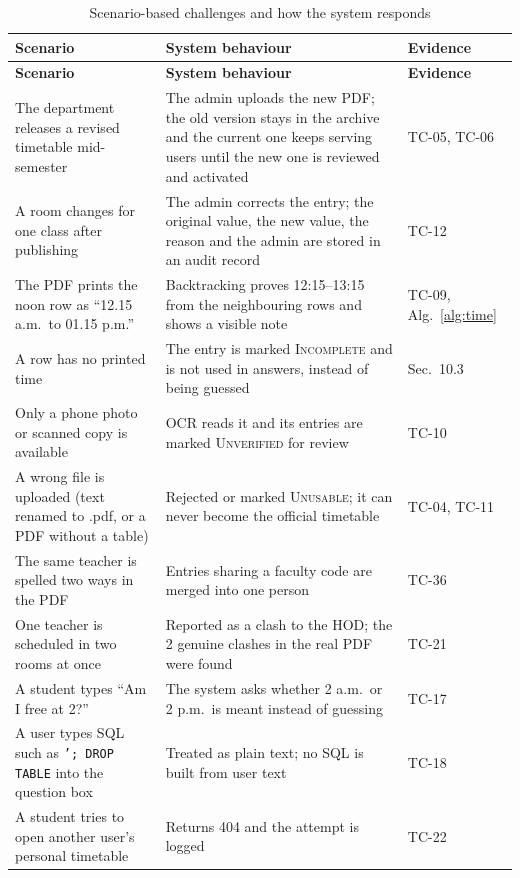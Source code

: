 \begingroup
\small
\begin{longtable}{@{}>{\raggedright\arraybackslash}p{4.2cm}>{\raggedright\arraybackslash}p{7.3cm}>{\raggedright\arraybackslash}p{2.6cm}@{}}
\caption{Scenario-based challenges and how the system responds}\label{tab:scenarios}\\
\toprule
\textbf{Scenario} & \textbf{System behaviour} & \textbf{Evidence}\\
\midrule
\endfirsthead
\toprule
\textbf{Scenario} & \textbf{System behaviour} & \textbf{Evidence}\\
\midrule
\endhead
The department releases a revised timetable mid-semester & The admin uploads the new PDF; the old version stays in the archive and the current one keeps serving users until the new one is reviewed and activated & TC-05, TC-06\\
A room changes for one class after publishing & The admin corrects the entry; the original value, the new value, the reason and the admin are stored in an audit record & TC-12\\
The PDF prints the noon row as ``12.15 a.m.\ to 01.15 p.m.'' & Backtracking proves 12:15--13:15 from the neighbouring rows and shows a visible note & TC-09, Alg.~\ref{alg:time}\\
A row has no printed time & The entry is marked \textsc{Incomplete} and is not used in answers, instead of being guessed & Sec.~10.3\\
Only a phone photo or scanned copy is available & OCR reads it and its entries are marked \textsc{Unverified} for review & TC-10\\
A wrong file is uploaded (text renamed to .pdf, or a PDF without a table) & Rejected or marked \textsc{Unusable}; it can never become the official timetable & TC-04, TC-11\\
The same teacher is spelled two ways in the PDF & Entries sharing a faculty code are merged into one person & TC-36\\
One teacher is scheduled in two rooms at once & Reported as a clash to the HOD; the 2 genuine clashes in the real PDF were found & TC-21\\
A student types ``Am I free at 2?'' & The system asks whether 2 a.m.\ or 2 p.m.\ is meant instead of guessing & TC-17\\
A user types SQL such as \texttt{'; DROP TABLE} into the question box & Treated as plain text; no SQL is built from user text & TC-18\\
A student tries to open another user's personal timetable & Returns 404 and the attempt is logged & TC-22\\

\end{longtable}
